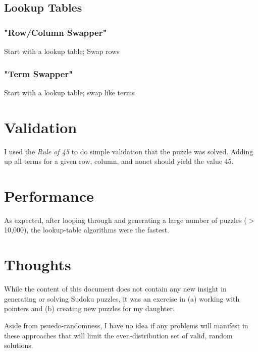 \documentclass{article}
\begin{document}
\subsection{Lookup Tables}

\subsubsection{"Row/Column Swapper"}
Start with a lookup table; Swap rows

\subsubsection{"Term Swapper"}
Start with a lookup table; swap like terms

\section{Validation}
I used the \textit{Rule of 45} to do simple validation that the puzzle was solved. Adding up all terms for a given row, column, and nonet should yield the value 45.

\section{Performance}
As expected, after looping through and generating a large number of puzzles ($>$10,000), the lookup-table algorithms were the fastest.

\section{Thoughts}
While the content of this document does not contain any new insight in generating or solving Sudoku puzzles, it was an exercise in (a) working with pointers and (b) creating new puzzles for my daughter.

Aside from psuedo-randomness, I have no idea if any problems will manifest in these approaches that will limit the even-distribution set of valid, random solutions.

\end{document}
